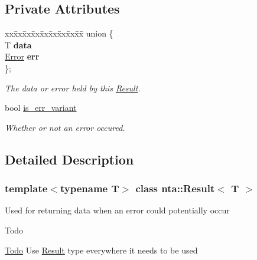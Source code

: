 \subsection*{Private Attributes}
\begin{DoxyCompactItemize}
\item 
\mbox{\label{classnta_1_1Result_a225adf68d093d584826f4aab98cacf97}} 
\begin{tabbing}
xx\=xx\=xx\=xx\=xx\=xx\=xx\=xx\=xx\=\kill
union \{\\
\mbox{\label{classnta_1_1Result_ab084104dfedebe7715d97987595ad147}} 
T {\bfseries data}\\
\mbox{\label{classnta_1_1Result_acd60a522df7b4adf81729de1dc626955}} 
\hyperlink{structnta_1_1Error}{Error} {\bfseries err}\\
\}; \\

\end{tabbing}\begin{DoxyCompactList}\small\item\em The data or error held by this \hyperlink{classnta_1_1Result}{Result}. \end{DoxyCompactList}\item 
\mbox{\label{classnta_1_1Result_a27f85dc35976426c1f5c01431ac2e1cc}} 
bool \hyperlink{classnta_1_1Result_a27f85dc35976426c1f5c01431ac2e1cc}{is\+\_\+err\+\_\+variant}
\begin{DoxyCompactList}\small\item\em Whether or not an error occured. \end{DoxyCompactList}\end{DoxyCompactItemize}


\subsection{Detailed Description}
\subsubsection*{template$<$typename T$>$\newline
class nta\+::\+Result$<$ T $>$}

Used for returning data when an error could potentially occur \begin{DoxyRefDesc}{Todo}
\item[\hyperlink{todo__todo000004}{Todo}]Use \hyperlink{classnta_1_1Result}{Result} type everywhere it needs to be used \end{DoxyRefDesc}


